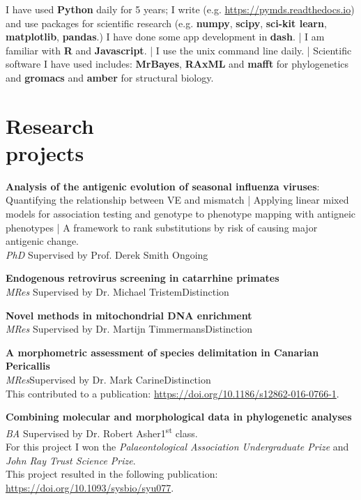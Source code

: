 \documentclass[margin]{res}
\begin{document}
\begin{resume}
I have used \textbf{Python} daily for 5 years; I write (e.g. \url{https://pymds.readthedocs.io}) and use packages for scientific research (e.g. \textbf{numpy}, \textbf{scipy}, \textbf{sci-kit learn}, \textbf{matplotlib}, \textbf{pandas}.) I have done some app development in \textbf{dash}.
|
I am familiar with \textbf{R} and \textbf{Javascript}.
|
I use the unix command line daily.
|
Scientific software I have used includes: \textbf{MrBayes}, \textbf{RAxML} and \textbf{mafft} for phylogenetics and \textbf{gromacs} and \textbf{amber} for structural biology.

\section{Research\\projects}

\par
\textbf{Analysis of the antigenic evolution of seasonal influenza viruses}: Quantifying the relationship between VE and mismatch | Applying linear mixed models for association testing and genotype to phenotype mapping with antigneic phenotypes | A framework to rank substitutions by risk of causing major antigenic change.\\
{\sl PhD} \hfill Supervised by Prof. Derek Smith \hfill Ongoing

\textbf{Endogenous retrovirus screening in catarrhine primates}\\
{\sl MRes} \hfill Supervised by Dr. Michael Tristem\hfill Distinction

\textbf{Novel methods in mitochondrial DNA enrichment}\\
{\sl MRes} \hfill Supervised by Dr. Martijn Timmermans\hfill Distinction

\textbf{A morphometric assessment of species delimitation in Canarian Pericallis}\\
{\sl MRes}\hfill Supervised by Dr. Mark Carine\hfill Distinction\\
This contributed to a publication: \url{https://doi.org/10.1186/s12862-016-0766-1}.

\textbf{Combining molecular and morphological data in phylogenetic analyses}\\
{\sl BA} \hfill Supervised by Dr. Robert Asher\hfill 1\textsuperscript{st} class.\\
For this project I won the {\sl Palaeontological Association Undergraduate Prize} and {\sl John Ray Trust Science Prize}.\\
This project resulted in the following publication: \url{https://doi.org/10.1093/sysbio/syu077}.


\end{resume}
\end{document}
